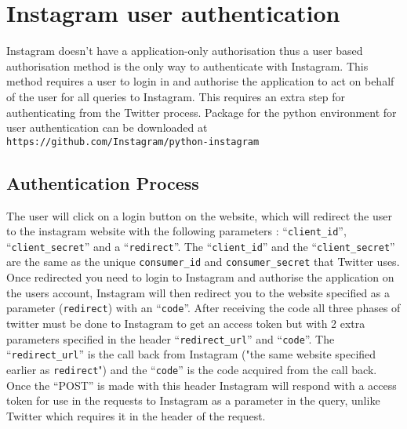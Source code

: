 \documentclass{article}
\begin{document}
\section{Instagram user authentication}
Instagram doesn't have a application-only authorisation thus a user based authorisation method is the only way to authenticate with Instagram. This method requires a user to login in and authorise the application to act on behalf of the user for all queries to Instagram. This requires an extra step for authenticating from the Twitter process. Package for the python environment for user authentication can be downloaded at \verb+https://github.com/Instagram/python-instagram+
\subsection{Authentication Process}
The user will click on a login button on the website, which will redirect the user to the instagram website with the following parameters : ``\verb+client_id+'', ``\verb+client_secret+'' and a ``\verb+redirect+''. The ``\verb+client_id+'' and the ``\verb+client_secret+'' are the same as the unique \verb+consumer_id+ and \verb+consumer_secret+ that Twitter uses. Once redirected you need to login to Instagram and authorise the application on the users account, Instagram will then redirect you to the website specified as a parameter (\verb+redirect+) with an ``\verb+code+''.
After receiving the code all three phases of twitter must be done to Instagram to get an access token but with 2 extra parameters specified in the header ``\verb+redirect_url+'' and ``\verb+code+''. The  ``\verb+redirect_url+'' is the call back from Instagram ("the same website specified earlier as \verb+redirect+") and the ``\verb+code+'' is the code acquired from the call back. Once the ``POST'' is made with this header Instagram will respond with a access token for use in the requests to Instagram as a parameter in the query, unlike Twitter which requires it in the header of the request. 
\end{document}
